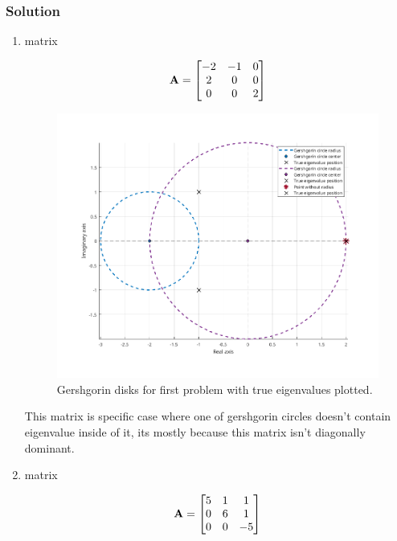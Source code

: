 \subsubsection*{Solution}
\begin{enumerate}
    \item matrix 
    
    \begin{equation*}
        \mathbf{A} = 
        \begin{bmatrix}
            -2 & -1 &  0\\
            2 &  0 &  0\\
            0 &  0 &  2 
        \end{bmatrix}
    \end{equation*}

    \begin{figure}[H]
        \centering
        \includegraphics[width=1\textwidth]{problems/Figures/Problem_7/first_matrix.png}
        \caption{Gershgorin disks for first problem with true eigenvalues plotted.}
        \label{fig:Inverse}
    \end{figure}
    This matrix is specific case where one of gershgorin circles doesn't contain eigenvalue inside of it, its mostly because this matrix isn't diagonally dominant.
    \item matrix
    
    \begin{equation*}
        \mathbf{A} = 
        \begin{bmatrix}
            5 & 1 &  1\\
            0 & 6 &  1\\
            0 & 0 &  -5 
        \end{bmatrix}
    \end{equation*}


\end{enumerate}

